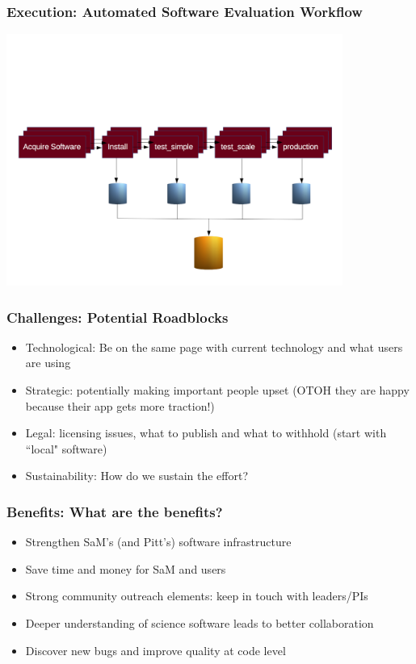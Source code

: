 \documentclass[hyperref={pdfpagelabels=false},12pt]{beamer}
\begin{document}
\begin{frame}
\frametitle{Execution: Automated Software Evaluation Workflow}
\begin{center}
\includegraphics[width=11cm]{workflow}
\end{center}
\end{frame}

\begin{frame}
\frametitle{Challenges: Potential Roadblocks}
\begin{itemize}
\itemsep1em
\item
Technological: Be on the same page with current technology and what users are using
\item 
Strategic: potentially making important people upset (OTOH they are happy because their app gets more traction!)
\item
Legal: licensing issues, what to publish and what to withhold (start with ``local" software)
\item
 Sustainability: How do we sustain the effort?
\end{itemize}
\end{frame}

\begin{frame}
\frametitle{Benefits: What are the benefits?}
\begin{itemize}
\itemsep1em
\item Strengthen SaM's (and Pitt's) software infrastructure
\item
Save time and money for SaM and users
\item
Strong community outreach elements: keep in touch with leaders/PIs 
\item
Deeper understanding of science software leads to better collaboration
\item
Discover new bugs and improve quality at code level
\end{itemize}
\end{frame}
\end{document}
